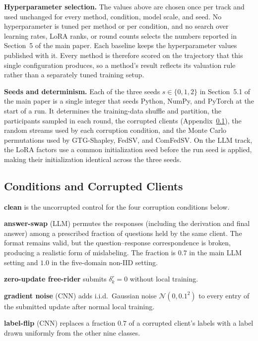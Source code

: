 \documentclass[letterpaper]{article} %
\theoremstyle{definition}
\begin{document}
\noindent\textbf{Hyperparameter selection.} The values above are chosen once per track
and used unchanged for every method, condition, model scale, and seed. No
hyperparameter is tuned per method or per condition, and no search over
learning rates, LoRA ranks, or round counts selects the numbers reported in
Section~5 of the main paper. Each baseline keeps the hyperparameter values
published with it. Every method is therefore scored on the trajectory that
this single configuration produces, so a method's result reflects its
valuation rule rather than a separately tuned training setup.

\noindent\textbf{Seeds and determinism.} Each of the three seeds
$s \in \{0, 1, 2\}$ in Section~5.1 of the main paper is a single integer that
seeds Python, NumPy, and PyTorch at the start of a run. It determines the
training-data shuffle and partition, the participants sampled in each round,
the corrupted clients (Appendix~\ref{app:conditions}), the random streams
used by each corruption condition, and the Monte Carlo permutations used by
GTG-Shapley, FedSV, and ComFedSV. On the LLM track, the LoRA factors use a
common initialization seed before the run seed is applied, making their
initialization identical across the three seeds.

\subsection{Conditions and Corrupted Clients}
\label{app:conditions}

\textbf{clean} is the uncorrupted control for the four corruption
conditions below.

\noindent\textbf{answer-swap} (LLM) permutes the responses (including the derivation
and final answer) among a prescribed fraction of questions held by the same
client. The format remains valid, but the question--response correspondence
is broken, producing a realistic form of mislabeling. The fraction is $0.7$
in the main LLM setting and $1.0$ in the five-domain non-IID setting.

\noindent\textbf{zero-update free-rider} submits $\delta_k^r = 0$ without local
training.

\noindent\textbf{gradient noise} (CNN) adds i.i.d.\ Gaussian noise
$\mathcal{N}(0, 0.1^2)$ to every entry of the submitted update after normal
local training.

\noindent\textbf{label-flip} (CNN) replaces a fraction $0.7$ of a corrupted client's
labels with a label drawn uniformly from the other nine classes.
\end{document}
